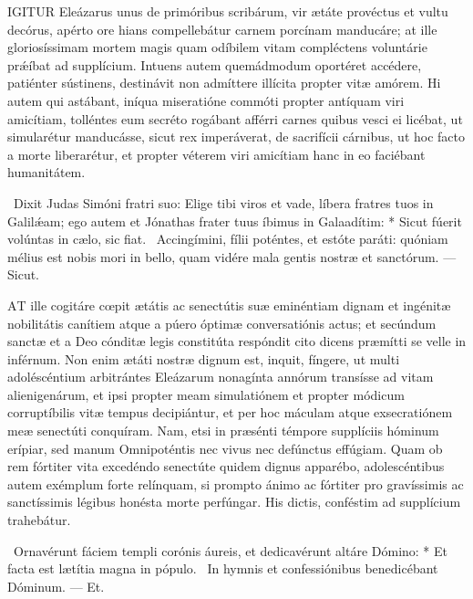 

\lettrine[lines=2]{I}{GITUR} Eleázarus unus de primóribus scribárum, vir ætáte provéctus et vultu decórus, apérto ore hians compellebátur carnem porcínam manducáre; at ille gloriosíssimam mortem magis quam odíbilem vitam compléctens voluntárie prǽíbat ad supplícium. Intuens autem quemádmodum oportéret accédere, patiénter sústinens, destinávit non admíttere illícita propter vitæ amórem. Hi autem qui astábant, iníqua miseratióne commóti propter antíquam viri amicítiam, tolléntes eum secréto rogábant afférri carnes quibus vesci ei licébat, ut simularétur manducásse, sicut rex imperáverat, de sacrifícii cárnibus, ut hoc facto a morte liberarétur, et propter véterem viri amicítiam hanc in eo faciébant humanitátem.

\R\ Dixit Judas Simóni fratri suo: Elige tibi viros et vade, líbera fratres tuos in Galilǽam; ego autem et Jónathas frater tuus íbimus in Galaadítim: * Sicut fúerit volúntas in cælo, sic fiat. \V\ Accingímini, fílii poténtes, et estóte paráti: quóniam mélius est nobis mori in bello, quam vidére mala gentis nostræ et sanctórum. — Sicut.


\lettrine[lines=2]{A}{T} ille cogitáre cœpit ætátis ac senectútis suæ eminéntiam dignam et ingénitæ nobilitátis canítiem atque a púero óptimæ conversatiónis actus; et secúndum sanctæ et a Deo cónditæ legis constitúta respóndit cito dicens præmítti se velle in inférnum. Non enim ætáti nostræ dignum est, inquit, fíngere, ut multi adoléscéntium arbitrántes Eleázarum nonagínta annórum transísse ad vitam alienigenárum, et ipsi propter meam simulatiónem et propter módicum corruptíbilis vitæ tempus decipiántur, et per hoc máculam atque exsecratiónem meæ senectúti conquíram. Nam, etsi in præsénti témpore supplíciis hóminum erípiar, sed manum Omnipoténtis nec vivus nec defúnctus effúgiam. Quam ob rem fórtiter vita excedéndo senectúte quidem dignus apparébo, adolescéntibus autem exémplum forte relínquam, si prompto ánimo ac fórtiter pro gravíssimis ac sanctíssimis légibus honésta morte perfúngar. His dictis, conféstim ad supplícium trahebátur.

\R\ Ornavérunt fáciem templi corónis áureis, et dedicavérunt altáre Dómino: * Et facta est lætítia magna in pópulo. \V\ In hymnis et confessiónibus benedicébant Dóminum. — Et.


